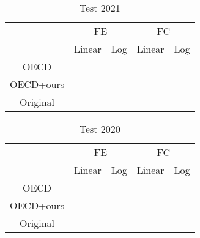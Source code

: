 \documentclass[11pt]{article}
\begin{document}
\pagestyle{empty}

\begin{table} \centering
    \caption{Test 2021}
    \begin{tabular}{c|c|c|c|c}
        \toprule
            & \multicolumn{2}{c}{FE} & \multicolumn{2}{c}{FC} \\
            & Linear & Log & Linear & Log \\
        \midrule
        OECD      &   &        &                                                      & \\
        \midrule
        OECD+ours &  &  &  &  \\
        \midrule
        Original  &    &    &  &  \\
        \bottomrule
    \end{tabular}
\end{table}

\newpage

\begin{table} \centering
    \caption{Test 2020}
    \begin{tabular}{c|c|c|c|c}
        \toprule
            & \multicolumn{2}{c}{FE} & \multicolumn{2}{c}{FC} \\
            & Linear & Log & Linear & Log \\
        \midrule
        OECD &  & & & \\
        \midrule
        
        OECD+ours &  &  &  & \\
        \midrule
        Original  & & & &  \\
        \bottomrule
    \end{tabular}
\end{table}
\end{document}
